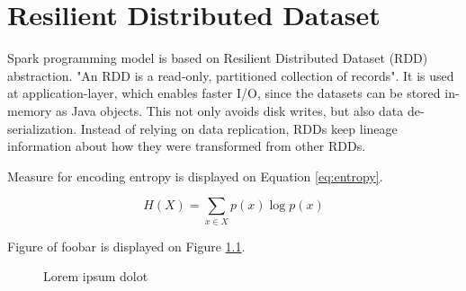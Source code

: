 \chapter{Resilient Distributed Dataset\label{ch:rdd}}

Spark programming model is based on Resilient Distributed Dataset (RDD) abstraction. "An RDD is a read-only,
partitioned collection of records". It is used at application-layer, which enables faster
I/O, since the datasets can be stored in-memory as Java objects. This not only avoids disk writes, but also data
de-serialization. Instead of relying on data replication, RDDs keep lineage information about how they were transformed
from other RDDs.

Measure for encoding entropy is displayed on Equation \ref{eq:entropy}.

\begin{equation}\label{eq:entropy}
  H(X) = \sum_{x\in X}p(x) \log p(x)
\end{equation}

Figure of foobar is displayed on Figure \ref{fig:foobar}.

\begin{figure}[t!]
  \centering
  \caption{Lorem ipsum dolot}\label{fig:foobar}
\end{figure}
